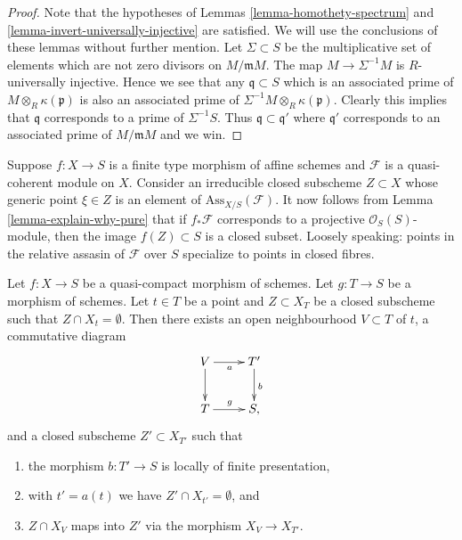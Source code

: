 \begin{proof}
Note that the hypotheses of
Lemmas \ref{lemma-homothety-spectrum} and
\ref{lemma-invert-universally-injective}
are satisfied. We will use the conclusions of these lemmas without further
mention. Let $\Sigma \subset S$ be the multiplicative set of elements
which are not zero divisors on $M/\mathfrak mM$. The map
$M \to \Sigma^{-1}M$ is $R$-universally injective. Hence we see that
any $\mathfrak q \subset S$ which is an associated prime of
$M \otimes_R \kappa(\mathfrak p)$ is also an associated prime of
$\Sigma^{-1}M \otimes_R \kappa(\mathfrak p)$. Clearly this implies that
$\mathfrak q$ corresponds to a prime of $\Sigma^{-1}S$.
Thus $\mathfrak q \subset \mathfrak q'$ where $\mathfrak q'$
corresponds to an associated prime of $M/\mathfrak mM$ and we win.
\end{proof}

\noindent
Suppose $f : X \to S$ is a finite type morphism of affine schemes and
$\mathcal{F}$ is a quasi-coherent module on $X$.
Consider an irreducible closed subscheme $Z \subset X$ whose generic point
$\xi \in Z$ is an element of $\text{Ass}_{X/S}(\mathcal{F})$.
It now follows from
Lemma \ref{lemma-explain-why-pure}
that if $f_*\mathcal{F}$ corresponds to a projective
$\mathcal{O}_S(S)$-module, then the image $f(Z) \subset S$ is a
closed subset. Loosely speaking: points in the relative assasin of
$\mathcal{F}$ over $S$ specialize to points in closed fibres.

\begin{lemma}
\label{lemma-separate}
Let $f : X \to S$ be a quasi-compact morphism of schemes.
Let $g : T \to S$ be a morphism of schemes.
Let $t \in T$ be a point and $Z \subset X_T$ be a closed
subscheme such that $Z \cap X_t = \emptyset$.
Then there exists an open neighbourhood
$V \subset T$ of $t$, a commutative diagram
$$
\xymatrix{
V \ar[d] \ar[r]_a & T' \ar[d]^b \\
T \ar[r]^g & S,
}
$$
and a closed subscheme $Z' \subset X_{T'}$ such that
\begin{enumerate}
\item the morphism $b : T' \to S$ is locally of finite presentation,
\item with $t' = a(t)$ we have $Z' \cap X_{t'} = \emptyset$, and
\item $Z \cap X_V$ maps into $Z'$ via the morphism $X_V \to X_{T'}$.
\end{enumerate}
\end{lemma}

